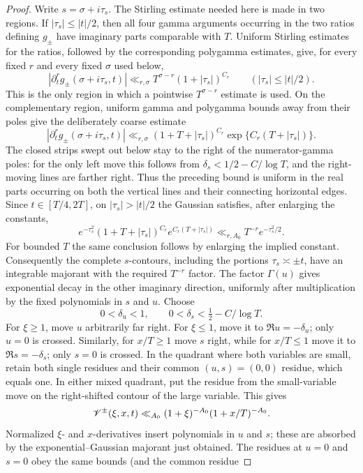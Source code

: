 \begin{proof}
Write $s=\sigma+i\tau_s$.  The Stirling estimate needed here is made in two
regions.  If $|\tau_s|\leq |t|/2$, then all four gamma arguments occurring in
the two ratios defining $g_\pm$ have imaginary parts comparable with $T$.
Uniform Stirling estimates for the ratios, followed by the corresponding
polygamma estimates, give, for every fixed $r$ and every fixed $\sigma$ used
below,
\[
 |\partial_t^r g_\pm(\sigma+i\tau_s,t)|
 \ll_{r,\sigma}T^{\sigma-r}(1+|\tau_s|)^{C_r}
 \qquad (|\tau_s|\leq |t|/2).
\]
This is the only region in which a pointwise $T^{\sigma-r}$ estimate is
used.  On the complementary region, uniform gamma and polygamma bounds away
from their poles give the deliberately coarse estimate
\[
 |\partial_t^r g_\pm(\sigma+i\tau_s,t)|
 \ll_{r,\sigma}(1+T+|\tau_s|)^{C_r}
       \exp\{C_r(T+|\tau_s|)\}.
\]
The closed strips swept out below stay to the right of the numerator-gamma
poles: for the only left move this follows from
$\delta_s<1/2-C/\log T$, and the right-moving lines are farther right.
Thus the preceding bound is uniform in the real parts occurring on both the
vertical lines and their connecting horizontal edges.  Since
$t\in[T/4,2T]$, on $|\tau_s|>|t|/2$ the Gaussian satisfies,
after enlarging the constants,
\[
 e^{-\tau_s^2}
 (1+T+|\tau_s|)^{C_r}e^{C_r(T+|\tau_s|)}
 \ll_{r,A_0}T^{-r}e^{-\tau_s^2/2}.
\]
For bounded $T$ the same conclusion follows by enlarging the implied
constant.  Consequently the complete $s$-contours, including the portions
$\tau_s\asymp\pm t$, have an integrable majorant with the required
$T^{-r}$ factor.  The factor $\Gamma(u)$ gives exponential decay in the
other imaginary direction, uniformly after multiplication by the fixed
polynomials in $s$ and $u$.  Choose
\[
 0<\delta_u<1,\qquad 0<\delta_s<\tfrac12-C/\log T.
\]
For $\xi\geq1$, move $u$ arbitrarily far right.  For $\xi\leq1$, move it to
$\Re u=-\delta_u$; only $u=0$ is crossed.  Similarly, for $x/T\geq1$ move
$s$ right, while for $x/T\leq1$ move it to
$\Re s=-\delta_s$; only $s=0$ is crossed.  In the quadrant where both
variables are small, retain both single residues and their common
$(u,s)=(0,0)$ residue, which equals one.  In either mixed quadrant, put the
residue from the small-variable move on the right-shifted contour of the large
variable.  This gives
\[
                    \mathscr V^\pm(\xi,x,t)
                    \ll_{A_0}(1+\xi)^{-A_0}(1+x/T)^{-A_0}.
\]
Normalized $\xi$- and $x$-derivatives insert polynomials in $u$ and $s$;
these are absorbed by the exponential--Gaussian majorant just obtained.
The residues at $u=0$ and $s=0$ obey the same bounds (and the common residue

\end{proof}
